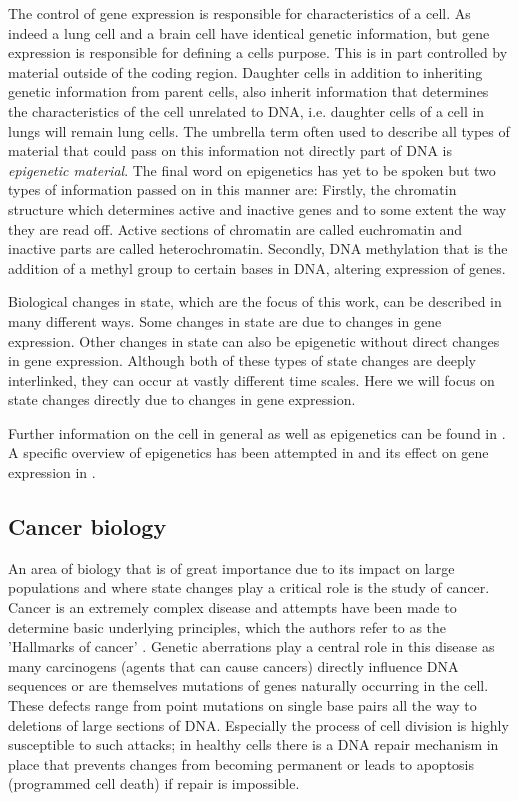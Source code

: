 The control of gene expression is responsible for characteristics of a cell. As indeed a lung cell and a brain cell have  identical genetic information, but gene expression is responsible for defining a cells purpose. This is in part controlled by material outside of the coding region. Daughter cells in addition to inheriting genetic information from parent cells, also inherit information that determines the characteristics of the cell unrelated to DNA, i.e. daughter cells of a cell in lungs will remain lung cells. The umbrella term often used to describe all types of material that could pass on this information not directly part of DNA is \emph{epigenetic material}. The final word on epigenetics has yet to be spoken but two types of information passed on in this manner are: Firstly, the chromatin structure which determines active and inactive genes and to some extent the way they are read off. Active sections of chromatin are called euchromatin and inactive parts are called heterochromatin. Secondly, DNA methylation that is the addition of a methyl group to certain bases in DNA, altering expression of genes.

Biological changes in state, which are the focus of this work, can be described in many different ways. Some changes in state are due to changes in gene expression. Other changes in state can also be epigenetic without direct changes in gene expression. Although both of these types of state changes are deeply interlinked, they can occur at vastly different time scales. Here we will focus on state changes directly due to changes in gene expression.

Further information on the cell in general as well as epigenetics can be found in \citet[Chapters~1,7]{Alberts:2007tv}. A specific overview of epigenetics has been attempted in \cite{Goldberg:2007tl} and its effect on gene expression in \cite{Gibney:2010ws}.

\subsection{Cancer biology}
\label{sec:cancer-biology}

An area of biology that is of great importance due to its impact on large populations and where state changes play a critical role is the study of cancer. Cancer is an extremely complex disease and attempts have been made to determine basic underlying principles, which the authors refer to as the 'Hallmarks of cancer' \citep{Hannah:2000wo, Hanahan:2011gu}. Genetic aberrations play a central role in this disease as many carcinogens (agents that can cause cancers) directly influence DNA sequences or are themselves mutations of genes naturally occurring in the cell. These defects range from point mutations on single base pairs all the way to deletions of large sections of DNA. Especially the process of cell division is highly susceptible to such attacks; in healthy cells there is a DNA repair mechanism in place that prevents  changes from becoming permanent or leads to apoptosis (programmed cell death) if repair is impossible.

